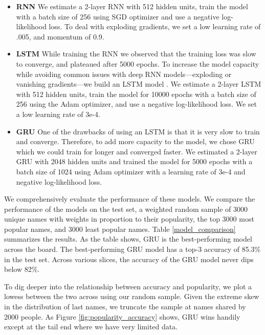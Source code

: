\documentclass[11pt,  letterpaper]{article}
\begin{document}
\begin{itemize}

    \item \textbf{RNN} We estimate a 2-layer RNN \citep{10.1145/3426826.3426842, 8469258} with 512 hidden units, train the model with a batch size of 256 using SGD optimizer and use a negative log-likelihood loss. To deal with exploding gradients, we set a low learning rate of .005, and momentum of 0.9.

    \item \textbf{LSTM} While training the RNN we observed that the training loss was slow to converge, and plateaued after 5000 epochs. To increase the model capacity while avoiding common issues with deep RNN models---exploding or vanishing gradients---we build an LSTM model \citep{hochreiter1997long}. We estimate a 2-layer LSTM with 512 hidden units, train the model for 10000 epochs with a batch size of 256 using the Adam optimizer, and use a negative log-likelihood loss. We set a low learning rate of 3e-4. 

    \item \textbf{GRU} One of the drawbacks of using an LSTM is that it is very slow to train and converge. Therefore, to add more capacity to the model, we chose GRU which we could train for longer and converged faster. We estimated a 2-layer GRU \citep{cho2014properties} with 2048 hidden units and trained the model for 5000 epochs with a batch size of 1024 using Adam optimizer with a learning rate of 3e-4 and negative log-likelihood loss. 

\end{itemize}

We comprehensively evaluate the performance of these models. We compare the performance of the models on the test set, a weighted random sample of 3000 unique names with weights in proportion to their popularity, the top 3000 most popular names, and 3000 least popular names. Table \ref{model_comparison} summarizes the results. As the table shows, GRU is the best-performing model across the board. The best-performing GRU model has a top-3 accuracy of 85.3\% in the test set. Across various slices, the accuracy of the GRU model never dips below 82\%. 



To dig deeper into the relationship between accuracy and popularity, we plot a lowess between the two across using our random sample. Given the extreme skew in the distribution of last names, we truncate the sample at names shared by 2000 people. As Figure \ref{fig:popularity_accuracy} shows, GRU wins handily except at the tail end where we have very limited data. 
\end{document}
